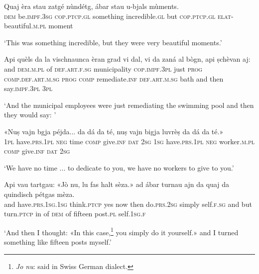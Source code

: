 \begin{linenumbers}
\gll  Quaj èra stau zatgé nùndétg, ábar stau u-bjals mùments.\\
 \textsc{dem} be.\textsc{impf.3sg} \textsc{cop.ptcp.gl} something incredible.\textsc{gl} but \textsc{cop.ptcp.gl}  \textsc{elat}-beautiful.\textsc{m.pl} moment \\
\end{linenumbers}
\medskip
\glt `This was something incredible, but they were very beautiful moments.'
\medskip

\begin{linenumbers}
\gll  Api quèls da la vischnaunca èran grad vi dal, vi da zaná al bògn, api ṣchèvan aj:  \\
and \textsc{dem.m.pl} of \textsc{def.art.f.sg} municipality \textsc{cop.impf.3pl} just \textsc{prog} \textsc{comp.def.art.m.sg} \textsc{prog} \textsc{comp} remediate.\textsc{inf} \textsc{def.art.m.sg} bath and then say.\textsc{impf.3pl} \textsc{3pl} \\
\end{linenumbers}
\medskip
\glt `And the municipal employees were just remediating the swimming pool and then they would say: '
\medskip

\begin{linenumbers}
\gll «Nuṣ vajn bgja péjda... da dá da té, nuṣ vajn bigja luvrèṣ da dá da té.»   \\
 \textsc{1pl} have.\textsc{prs.1pl} \textsc{neg} time \textsc{comp} give.\textsc{inf} \textsc{dat} \textsc{2sg} \textsc{1sg} have.\textsc{prs.1pl} \textsc{neg} worker.\textsc{m.pl} \textsc{comp} give.\textsc{inf} \textsc{dat} \textsc{2sg}\\
\end{linenumbers}
\medskip
\glt `We have no time ... to dedicate to you, we have no workers to give to you.'
\medskip

\begin{linenumbers}
\gll  Api vau tartgau: «Jò nu, lu fas halt sèza.» ad ábar turnau ajn da quaj da quindisch pétgas mèza.  \\
and have.\textsc{prs.1sg.1sg} think.\textsc{ptcp} yes now then  do.\textsc{prs.2sg} simply self.\textsc{f.sg} and but turn.\textsc{ptcp} in of \textsc{dem} of fifteen post.\textsc{pl} self.\textsc{1sg.f} \\
\end{linenumbers}
\medskip
\glt `And then I thought: «In this case,\footnote{\textit{Jo nu}: said in Swiss German dialect.} you simply do it yourself.» and I turned something like fifteen posts myself.'
\medskip

